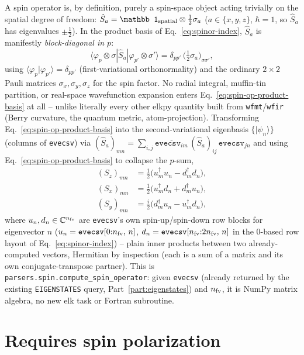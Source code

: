 \documentclass[11pt]{article}
\begin{document}
A spin operator is, by definition, purely a spin-space object acting trivially on the spatial
degree of freedom: $\hat S_a = \mathbb 1_{\rm spatial}\otimes\tfrac12\sigma_a$ ($a\in\{x,y,z\}$,
$\hbar=1$, so $\hat S_a$ has eigenvalues $\pm\tfrac12$). In the product basis of
Eq.~\eqref{eq:spinor-index}, $\hat S_a$ is manifestly \emph{block-diagonal in $p$}:
\begin{equation}
  \langle\varphi_p\otimes\sigma|\hat S_a|\varphi_{p'}\otimes\sigma'\rangle
  = \delta_{pp'}\,\big(\tfrac12\sigma_a\big)_{\sigma\sigma'},
  \label{eq:spin-op-product-basis}
\end{equation}
using $\langle\varphi_p|\varphi_{p'}\rangle=\delta_{pp'}$ (first-variational orthonormality)
and the ordinary $2\times2$ Pauli matrices $\sigma_x,\sigma_y,\sigma_z$ for the spin factor.
No radial integral, muffin-tin partition, or real-space wavefunction expansion enters
Eq.~\eqref{eq:spin-op-product-basis} at all -- unlike literally every other elkpy quantity
built from \texttt{wfmt}/\texttt{wfir} (Berry curvature, the quantum metric,
atom-projection). Transforming Eq.~\eqref{eq:spin-op-product-basis} into the second-variational
eigenbasis $\{|\psi_n\rangle\}$ (columns of \texttt{evecsv}) via
$(\hat S_a)_{mn}=\sum_{i,j}\overline{\texttt{evecsv}_{im}}\,(\hat S_a)_{ij}\,\texttt{evecsv}_{jn}$
and using Eq.~\eqref{eq:spin-op-product-basis} to collapse the $p$-sum,
\begin{align}
  (S_z)_{mn} &= \tfrac12\Big(u_m^\dagger u_n - d_m^\dagger d_n\Big), \label{eq:sz}\\
  (S_x)_{mn} &= \tfrac12\Big(u_m^\dagger d_n + d_m^\dagger u_n\Big), \label{eq:sx}\\
  (S_y)_{mn} &= \tfrac{i}{2}\Big(d_m^\dagger u_n - u_m^\dagger d_n\Big), \label{eq:sy}
\end{align}
where $u_n,d_n\in\mathbb C^{n_{\rm fv}}$ are \texttt{evecsv}'s own spin-up/spin-down row
blocks for eigenvector $n$ ($u_n=\texttt{evecsv}[0{:}n_{\rm fv},\,n]$,
$d_n=\texttt{evecsv}[n_{\rm fv}{:}2n_{\rm fv},\,n]$ in the 0-based row layout of
Eq.~\eqref{eq:spinor-index}) -- plain inner products between two already-computed vectors,
Hermitian by inspection (each is a sum of a matrix and its own conjugate-transpose partner).
This is \texttt{parsers.spin.compute\_spin\_operator}: given \texttt{evecsv} (already returned
by the existing \texttt{EIGENSTATES} query, Part~\ref{part:eigenstates}) and $n_{\rm fv}$, it
is NumPy matrix algebra, no new elk task or Fortran subroutine.

\section{Requires spin polarization}
\end{document}
